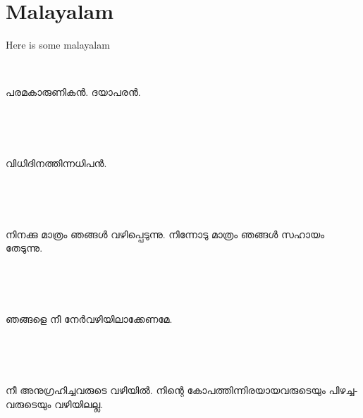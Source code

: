 \documentclass{report}
\begin{document}
\section{Malayalam}
\begin{center}
\Huge{
\begin{Arabic}
\basmalah
\end{Arabic}}
\end{center}
Here is some malayalam
\flushright{

\begin{Arabic}
\quranayah[1][1]
\end{Arabic}}
\flushright{
\begin{Arabic}
\quranayah[1][2]
\end{Arabic}}
\begin{Arabic}
\quranayah[1][3]
\end{Arabic}
\\\begin{malayalam}
പരമകാരുണികന്‍. ദയാപരന്‍.
\end{malayalam}\\
\begin{Arabic}
\quranayah[1][4]
\end{Arabic}
\\\begin{malayalam}
വിധിദിനത്തിന്നധിപന്‍.
\end{malayalam}\\
\begin{Arabic}
\quranayah[1][5]
\end{Arabic}
\\\begin{malayalam}
നിനക്കു മാത്രം ഞങ്ങള്‍ വഴിപ്പെടുന്നു. നിന്നോടു മാത്രം ഞങ്ങള്‍ സഹായം തേടുന്നു.
\end{malayalam}\\
\begin{Arabic}
\quranayah[1][6]
\end{Arabic}
\\\begin{malayalam}
ഞങ്ങളെ നീ നേര്‍വഴിയിലാക്കേണമേ.
\end{malayalam}\\
\begin{Arabic}
\quranayah[1][7]
\end{Arabic}
\\\begin{malayalam}
നീ അനുഗ്രഹിച്ചവരുടെ വഴിയില്‍. നിന്റെ കോപത്തിന്നിരയായവരുടെയും പിഴച്ചവരുടെയും വഴിയിലല്ല.
\end{malayalam}
\end{document}
